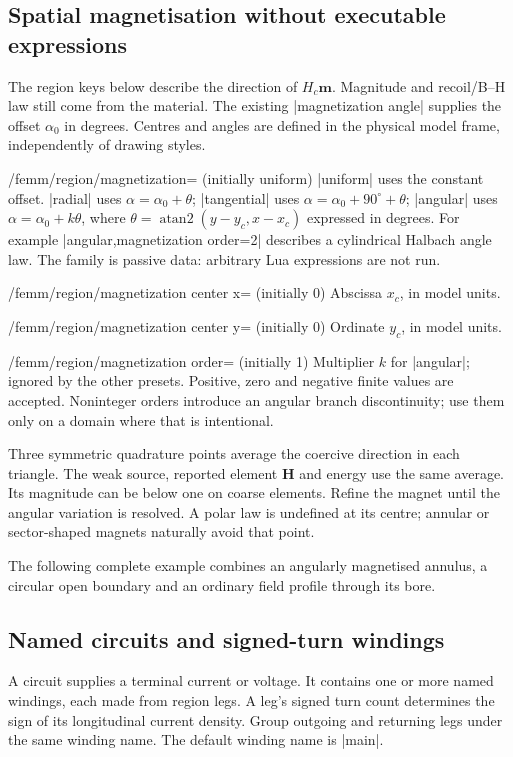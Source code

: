 \subsection{Spatial magnetisation without executable expressions}
The region keys below describe the direction of $H_c\mathbf m$. Magnitude and
recoil/B--H law still come from the material. The existing
|magnetization angle| supplies the offset $\alpha_0$ in degrees. Centres and
angles are defined in the physical model frame, independently of drawing styles.

\begin{key}{/femm/region/magnetization= (initially uniform)}
|uniform| uses the constant offset. |radial| uses
$\alpha=\alpha_0+\theta$; |tangential| uses
$\alpha=\alpha_0+90^\circ+\theta$; |angular| uses
$\alpha=\alpha_0+k\theta$, where
$\theta=\operatorname{atan2}(y-y_c,x-x_c)$ expressed in degrees.
For example |angular,magnetization order=2| describes a cylindrical Halbach
angle law. The family is passive data: arbitrary Lua expressions are not run.
\end{key}
\begin{key}{/femm/region/magnetization center x= (initially 0)}
Abscissa $x_c$, in model units.
\end{key}
\begin{key}{/femm/region/magnetization center y= (initially 0)}
Ordinate $y_c$, in model units.
\end{key}
\begin{key}{/femm/region/magnetization order= (initially 1)}
Multiplier $k$ for |angular|; ignored by the other presets. Positive, zero and
negative finite values are accepted. Noninteger orders introduce an angular
branch discontinuity; use them only on a domain where that is intentional.
\end{key}

Three symmetric quadrature points average the coercive direction in each
triangle. The weak source, reported element $\mathbf H$ and energy use the same
average. Its magnitude can be below one on coarse elements. Refine the magnet
until the angular variation is resolved. A polar law is undefined at its centre;
annular or sector-shaped magnets naturally avoid that point.

The following complete example combines an angularly magnetised annulus, a
circular open boundary and an ordinary field profile through its bore.

\subsection{Named circuits and signed-turn windings}
A circuit supplies a terminal current or voltage. It contains one or more named
windings, each made from region legs. A leg's signed turn count determines the
sign of its longitudinal current density. Group outgoing and returning legs
under the same winding name. The default winding name is |main|.


